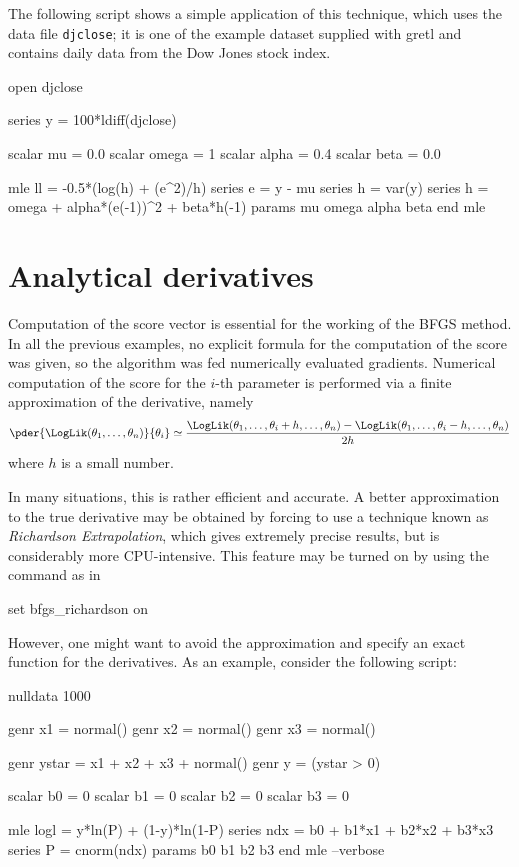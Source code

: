 The following script shows a simple application of this technique,
which uses the data file \texttt{djclose}; it is one of the example
dataset supplied with gretl and contains daily data from the Dow Jones
stock index.

\begin{code}
open djclose

series y = 100*ldiff(djclose)

scalar mu = 0.0
scalar omega = 1
scalar alpha = 0.4
scalar beta = 0.0

mle ll = -0.5*(log(h) + (e^2)/h)
  series e = y - mu
  series h = var(y)
  series h = omega + alpha*(e(-1))^2 + beta*h(-1)
  params mu omega alpha beta
end mle
\end{code}

\section{Analytical derivatives}
\label{sec:anal-der}

Computation of the score vector is essential for the working of the
BFGS method. In all the previous examples, no explicit formula for the
computation of the score was given, so the algorithm was fed
numerically evaluated gradients. Numerical computation of the score for
the $i$-th parameter is performed via a finite approximation of the
derivative, namely
\[
  \pder{\LogLik(\theta_1, \ldots, \theta_n)}{\theta_i} \simeq 
  \frac{\LogLik(\theta_1, \ldots, \theta_i + h, \ldots, \theta_n) -
    \LogLik(\theta_1, \ldots, \theta_i - h, \ldots, \theta_n)}{2h}
\]
where $h$ is a small number. 

In many situations, this is rather efficient and accurate. A better
approximation to the true derivative may be obtained by forcing
 to use a technique known as \emph{Richardson Extrapolation},
which gives extremely precise results, but is considerably more
CPU-intensive. This feature may be turned on by using the 
command as in
\begin{code}
  set bfgs_richardson on
\end{code}

However, one might want to avoid the approximation and specify an
exact function for the derivatives. As an example, consider the
following script:
%
\begin{code}
nulldata 1000

genr x1 = normal()
genr x2 = normal()
genr x3 = normal()

genr ystar = x1 + x2 + x3 + normal()
genr y = (ystar > 0)

scalar b0 = 0
scalar b1 = 0
scalar b2 = 0
scalar b3 = 0

mle logl = y*ln(P) + (1-y)*ln(1-P)
  series ndx = b0 + b1*x1 + b2*x2 + b3*x3
  series P = cnorm(ndx)
  params b0 b1 b2 b3
end mle --verbose
\end{code}

